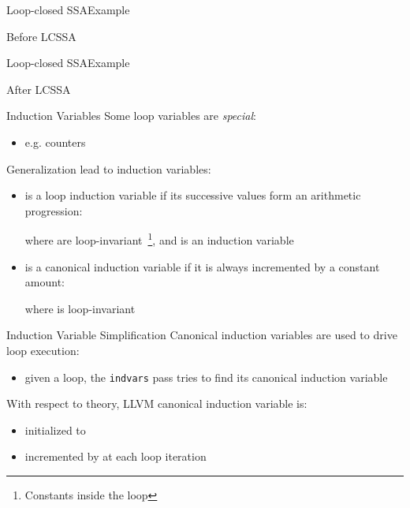 \begin{frame}{Loop-closed SSA}{Example}
\begin{block}{Before LCSSA}
\centering
{}
\end{block}
\vspace{\baselineskip}
\vfill
\end{frame}

\begin{frame}{Loop-closed SSA}{Example}
\begin{block}{After LCSSA}
\centering
{}
\end{block}
\vfill
\end{frame}

\begin{frame}{Induction Variables}
Some loop variables are \emph{special}:

\begin{itemize}
\item e.g. counters
\end{itemize}

\vfill
Generalization lead to \alert{induction variables}:

\begin{itemize}
\item {} is a loop induction variable if its successive values form
      an arithmetic progression:

      \begin{center}
      \end{center}

      where  are
      loop-invariant~\footnote{Constants inside the loop}, and  is
      an induction variable
\item {} is a \alert{canonical} induction variable if it is always
      incremented by a constant amount:

      \begin{center}
      \end{center}

      where  is loop-invariant
\end{itemize}
\end{frame}

\begin{frame}{Induction Variable Simplification}
Canonical induction variables are used to \alert{drive} loop execution:

\begin{itemize}
\item given a loop, the \texttt{indvars} pass tries to find its canonical
      induction variable
\end{itemize}

\vfill
With respect to theory, LLVM canonical induction variable is:

\begin{itemize}
\item initialized to 
\item incremented by  at each loop iteration
\end{itemize}
\end{frame}

